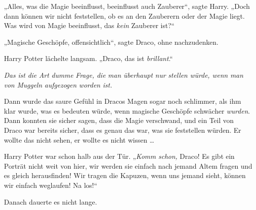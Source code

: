 „Alles, was die Magie beeinflusst, beeinflusst auch Zauberer“, sagte Harry.
„Doch dann können wir nicht feststellen, ob es an den Zauberern oder der Magie liegt. Was wird von Magie beeinflusst, das \emph{kein} Zauberer ist?“

„Magische Geschöpfe, offensichtlich“, sagte Draco, ohne nachzudenken.

Harry Potter lächelte langsam.
„Draco, das ist \emph{brillant}.“

\emph{Das ist die Art dumme Frage, die man überhaupt nur stellen würde, wenn man von Muggeln aufgezogen worden ist.}

Dann wurde das saure Gefühl in Dracos Magen sogar noch schlimmer, als ihm klar wurde, was es bedeuten würde, wenn magische Geschöpfe schwächer \emph{wurden}. Dann konnten sie sicher sagen, dass die Magie verschwand, und ein Teil von Draco war bereits sicher, dass es genau das war, was sie feststellen würden. Er wollte das nicht sehen, er wollte es nicht wissen …

Harry Potter war schon halb aus der Tür.
„\emph{Komm schon,} Draco! Es gibt ein Porträt nicht weit von hier, wir werden sie einfach nach jemand Altem fragen und es gleich herausfinden! Wir tragen die Kapuzen, wenn uns jemand sieht, können wir einfach weglaufen! Na los!“

\later

Danach dauerte es nicht lange.

